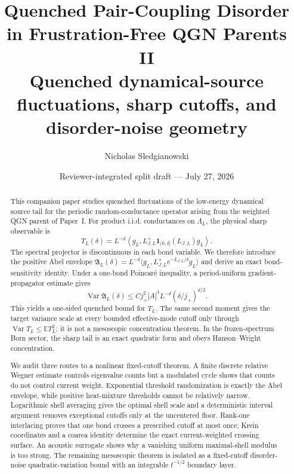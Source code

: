 \documentclass[11pt]{article}
\title{\textbf{Quenched Pair-Coupling Disorder in Frustration-Free QGN Parents II}\\[0.35em]
\large Quenched dynamical-source fluctuations, sharp cutoffs, and disorder-noise geometry}
\author{Nicholas Sledgianowski}
\date{Reviewer-integrated split draft --- July 27, 2026}
\theoremstyle{definition}
\theoremstyle{remark}
\newcommand{\E}{\mathbb E}
\newcommand{\Var}{\operatorname{Var}}
\newcommand{\ip}[2]{\left\langle #1,#2\right\rangle}
\newcommand{\abs}[1]{\left\lvert #1\right\rvert}
\begin{document}
\maketitle

\begin{abstract}
This companion paper studies quenched fluctuations of the low-energy dynamical source tail for the periodic random-conductance operator arising from the weighted QGN parent of Paper~I.  For product i.i.d. conductances on $\Lambda_L$, the physical sharp observable is
\[
 T_L(\delta)=L^{-d}\ip{g_L}{L_{J,L}^+\bm1_{(0,\delta]}(L_{J,L})g_L}.
\]
The spectral projector is discontinuous in each bond variable.  We therefore introduce the positive Abel envelope
$\mathfrak A_L(\delta)=L^{-d}\langle g_L,L_{J,L}^+e^{-L_{J,L}/\delta}g_L\rangle$ and derive an exact bond-sensitivity identity.  Under a one-bond Poincar\'e inequality, a period-uniform gradient-propagator estimate gives
\[
 \Var\mathfrak A_L(\delta)\le Cj_+^2\abs A^4L^{-d}(\delta/j_+)^{d/2}.
\]
This yields a one-sided quenched bound for $T_L$.  The same second moment gives the target variance scale at every bounded effective-mode cutoff only through $\Var T_L\le\E T_L^2$; it is not a mesoscopic concentration theorem.  In the frozen-spectrum Born sector, the sharp tail is an exact quadratic form and obeys Hanson--Wright concentration.

We audit three routes to a nonlinear fixed-cutoff theorem.  A finite discrete relative Wegner estimate controls eigenvalue counts but a modulated cycle shows that counts do not control current weight.  Exponential threshold randomization is exactly the Abel envelope, while positive heat-mixture thresholds cannot be relatively narrow.  Logarithmic shell averaging gives the optimal shell scale and a deterministic interval argument removes exceptional cutoffs only at the uncentered floor.  Rank-one interlacing proves that one bond crosses a prescribed cutoff at most once; Krein coordinates and a coarea identity determine the exact current-weighted crossing surface.  An acoustic surrogate shows why a vanishing uniform maximal-shell modulus is too strong.  The remaining mesoscopic theorem is isolated as a fixed-cutoff disorder-noise quadratic-variation bound with an integrable $t^{-1/2}$ boundary layer.
\end{abstract}
\end{document}

